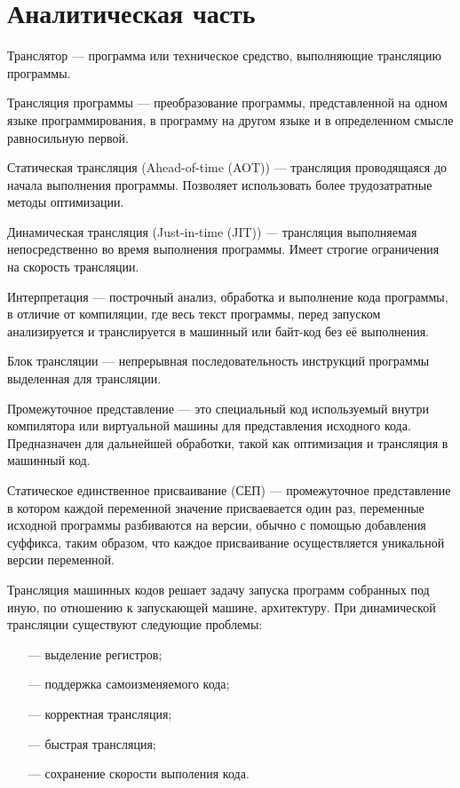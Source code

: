 \section{Аналитическая часть}
 
Транслятор --- программа или техническое средство, выполняющие трансляцию программы. \cite{translate}
 
Трансляция программы --- преобразование программы, представленной на одном языке программирования, в программу на другом языке и в определенном смысле равносильную первой. \cite{translate}
 
Статическая трансляция (Ahead-of-time (AOT)) --- трансляция проводящаяся до начала выполнения программы. Позволяет использовать более трудозатратные методы оптимизации.

Динамическая трансляция (Just-in-time (JIT)) --- трансляция выполняемая непосредственно во время выполнения программы. Имеет строгие ограничения на скорость трансляции.

Интерпретация --- построчный анализ, обработка и выполнение кода программы, в отличие от компиляции, где весь текст программы, перед запуском анализируется и транслируется в машинный или байт-код без её выполнения. \cite{interpret}
 
Блок трансляции --- непрерывная последовательность инструкций программы выделенная для трансляции.
 
Промежуточное представление ---  это специальный код используемый внутри компилятора или виртуальной машины для представления исходного кода. Предназначен для дальнейшей обработки, такой как оптимизация и трансляция в машинный код.
 
Статическое единственное присваивание (СЕП) --- промежуточное представление в котором каждой переменной значение присваевается один раз, переменные исходной программы разбиваются на версии, обычно с помощью добавления суффикса, таким образом, что каждое присваивание осуществляется уникальной версии переменной.
  
Трансляция машинных кодов решает задачу запуска программ собранных под иную, по отношению к запускающей машине, архитектуру. При динамической трансляции существуют следующие проблемы:

\begin{itemize}[leftmargin=1.6\parindent]
	\item[---] выделение регистров;
	\item[---] поддержка самоизменяемого кода;
	\item[---] корректная трансляция;
	\item[---] быстрая трансляция;
	\item[---] сохранение скорости выполения кода.
\end{itemize}

